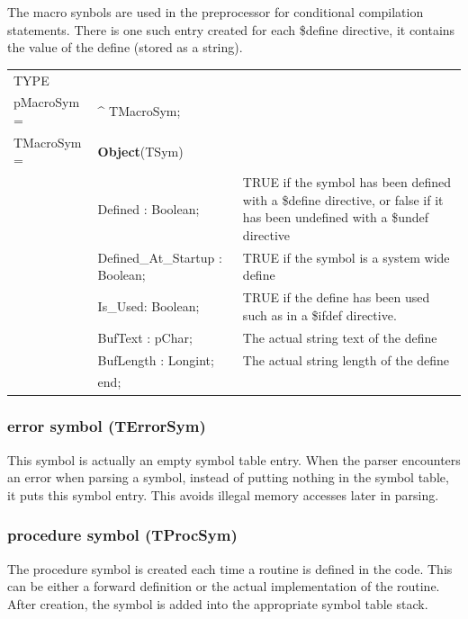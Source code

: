 \documentclass [a4paper,12pt]{article}
\begin{document}
The macro synbols are used in the preprocessor for conditional compilation
statements. There is one such entry created for each {\$}define directive,
it contains the value of the define (stored as a string).

\begin{tabular*}{6.5in}{|l@{\extracolsep{\fill}}lp{6cm}|}
\hline
\textsf{TYPE}& & \\
\xspace pMacroSym = & \^{}  TMacroSym; & \\
\xspace \textsf{TMacroSym} = & \textbf{Object}(TSym) & \\
& \textsf{Defined : Boolean;}&
    TRUE if the symbol has been defined with a \textsf{{\$}define}
    directive, or false if it has been undefined with a
    \textsf{{\$}undef} directive \\
& \textsf{Defined{\_}At{\_}Startup : Boolean;}&
    TRUE if the symbol is a system wide define \\
& \textsf{Is{\_}Used: Boolean;}&
    TRUE if the define has been used such as in a \textsf{{\$}ifdef}
    directive. \\
& \textsf{BufText : pChar;}&
    The actual string text of the define \\
& \textsf{BufLength : Longint;}&
    The actual string length of the define \\
& \textsf{end;}&  \\
\hline
\end{tabular*}

\subsubsection{error symbol (TErrorSym)}
\label{subsubsec:error}

This symbol is actually an empty symbol table entry. When the parser
encounters an error when parsing a symbol, instead of putting nothing in the
symbol table, it puts this symbol entry. This avoids illegal memory accesses
later in parsing.

\subsubsection{procedure symbol (TProcSym)}
\label{subsubsec:procedure}

The procedure symbol is created each time a routine is defined in the code.
This can be either a forward definition or the actual implementation of the
routine. After creation, the symbol is added into the appropriate symbol
table stack.
\end{document}
